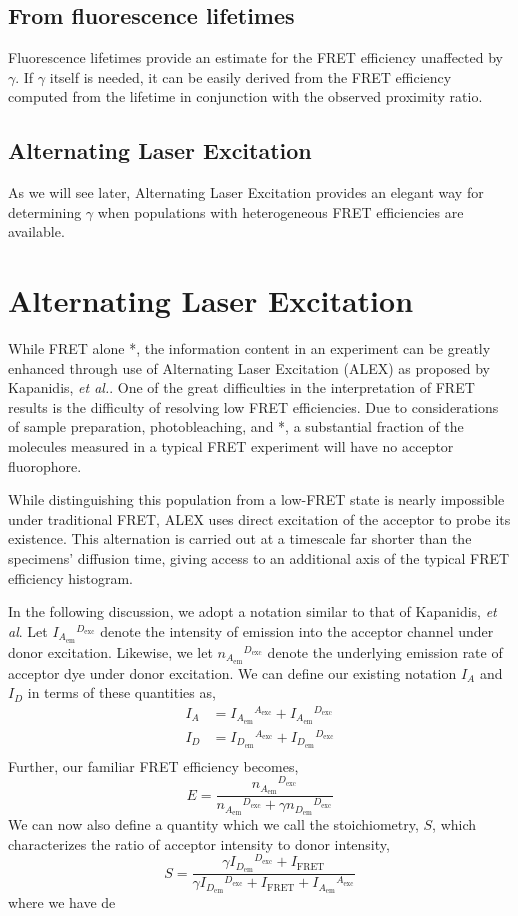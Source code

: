 \documentclass{article}
\newcommand{\emm}[1]{\ensuremath{_{#1_\mathrm{em}}}}   %
\newcommand{\exc}[1]{\ensuremath{^{#1_\mathrm{exc}}}}  %
\begin{document}
\subsection{From fluorescence lifetimes}

Fluorescence lifetimes provide an estimate for the FRET efficiency
unaffected by $\gamma$. If $\gamma$ itself is needed, it can be easily
derived from the FRET efficiency computed from the lifetime in
conjunction with the observed proximity ratio.

\subsection{Alternating Laser Excitation}

As we will see later, Alternating Laser Excitation provides an elegant 
way for determining $\gamma$ when populations with heterogeneous FRET
efficiencies are available.

\section{Alternating Laser Excitation}
While FRET alone *, the information content in an experiment can be
greatly enhanced through use of Alternating Laser Excitation (ALEX) as
proposed by Kapanidis, {\it et al.}\cite{Kapanidis2005}. One of the
great difficulties in the interpretation of FRET results is the
difficulty of resolving low FRET efficiencies. Due to considerations
of sample preparation, photobleaching, and *, a substantial fraction
of the molecules measured in a typical FRET experiment will have no
acceptor fluorophore.

While distinguishing this population from a low-FRET state is nearly
impossible under traditional FRET, ALEX uses direct excitation of the
acceptor to probe its existence. This alternation is carried out at a
timescale far shorter than the specimens' diffusion time, giving
access to an additional axis of the typical FRET efficiency histogram.

In the following discussion, we adopt a notation similar to that of
Kapanidis, {\it et al}. Let $I\emm{A}\exc{D}$ denote the intensity of
emission into the acceptor channel under donor excitation. Likewise,
we let $n\emm{A}\exc{D}$ denote the underlying emission rate of
acceptor dye under donor excitation.  We can define our existing
notation $I_A$ and $I_D$ in terms of these quantities as,
\begin{align*}
  I_A & = I\emm{A}\exc{A} + I\emm{A}\exc{D} \\
  I_D & = I\emm{D}\exc{A} + I\emm{D}\exc{D} \\
\end{align*}
Further, our familiar FRET efficiency becomes,
\[ E = \frac{ n\emm{A}\exc{D} }{ n\emm{A}\exc{D} + \gamma n\emm{D}\exc{D} } \]
We can now also define a quantity which we call the
stoichiometry, $S$, which characterizes the ratio of acceptor
intensity to donor intensity,
\newcommand{\Ifret}{\ensuremath{I_\mathrm{FRET}}}
\[ S = \frac{\gamma I\emm{D}\exc{D} + \Ifret}{\gamma I\emm{D}\exc{D} + \Ifret + I\emm{A}\exc{A}} \]
where we have de
\end{document}
